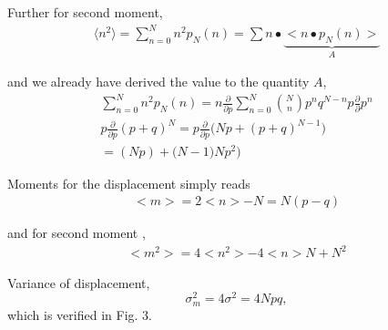 \documentclass[showpacs,amsmath,amssymb,aps,pre,twocolumn]{revtex4-1}
\def\p{\partial}
\begin{document}
Further for second moment, 
\begin{gather*}
\langle n^2 \rangle=    \sum_{n=0}^{N} n^2 p_N(n) = \sum n• \underbrace{\big<n•p_N(n)\big>}_A
\end{gather*}

and we already have derived the value to the quantity $A$, 
\begin{gather*}
    \sum_{n=0}^{N} n^2 p_N(n) = n \frac{\partial}{\partial p} \sum_{n=0}^{N} \binom{N}{n} p^n q^{N-n} p \frac{\partial}{\partial} p^n
    \\p \frac{\partial}{\partial p} (p+q)^N  = p \frac{\partial}{\partial p} \big( Np + (p+q)^{N-1} \big)\\
    =(Np) + \bigg(N-1)Np^2\bigg)
\end{gather*}



Moments for the displacement simply reads
\begin{align}
    <m> = 2<n> - N = N(p-q)
\end{align}

and for second moment , 
\begin{align}
    <m^2> = 4<n^2> - 4<n>N + N^2
\end{align}

Variance of displacement, 
\begin{equation}
    \sigma_m ^2 = 4\sigma^2 = 4Npq,
\end{equation}
which is verified in Fig. 3.
\newline


\end{document}
